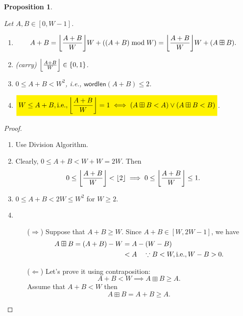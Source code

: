 \documentclass[12pt,openany]{book}
\DeclarePairedDelimiter{\floor}{\lfloor}{\rfloor}
\newcommand{\mathcolorbox}[2]{\colorbox{#1}{$\displaystyle #2$}}
\newtheorem{proposition}[theorem]{Proposition}
\theoremstyle{definition}
\newcommand{\ie}{\textnormal{i.e.}}
\newcommand{\wordlen}{\mathsf{wordlen}}
\begin{document}
	\begin{tcolorbox}[colframe=procolor,title={\color{white}\bf Single-Word Addition \(A+B\)}]
		\begin{proposition}\hypertarget{prop2.2}{}
			Let \(A,B\in[0,W-1]\). \begin{enumerate}[(1)]
				\item \begin{align*}
					A+B=\floor*{\frac{A+B}{W}}W+((A+B)\bmod W)
					=\floor*{\frac{A+B}{W}}W+(A\boxplus B).
				\end{align*}
				\item (carry) \(\floor*{\frac{A+B}{W}}\in\set{0,1}\).
				\item \(0\leq A+B< W^2\), \ie, \(\wordlen(A+B)\leq 2\).
				\item \(\mathcolorbox{yellow}{W\leq A+B,\ie,\floor*{\frac{A+B}{W}}=1\iff (A\boxplus B< A)\lor (A\boxplus B<B)}\).
			\end{enumerate}
		\end{proposition}
	\end{tcolorbox}
	\begin{proof}
		\begin{enumerate}[(1)]
			\item Use Division Algorithm.
			\item Clearly, \(0\leq A+B<W+W=2W\). Then 
			\[
			0\leq\floor*{\frac{A+B}{W}}<\floor{2}\implies0\leq\floor*{\frac{A+B}{W}}\leq 1.
			\]
			\item \(0\leq A+B<2W\leq W^2\) for \(W\geq 2\). 
			\item \begin{itemize}
				\item[(\(\Rightarrow\))] Suppose that \(A+B\geq W\). Since \(A+B\in[W,2W-1]\), we have \begin{align*}
					A\boxplus B=(A+B)-W&=A-(W-B)\\
					&<A\quad\because B<W,\ie, W-B>0.
				\end{align*}
				\item[(\(\Leftarrow\))] Let's prove it using contraposition:  \[
				A+B<W\implies A\boxplus B\geq A.
				\] Assume that \(A+B<W\) then \[
				A\boxplus B=A+B\geq A.
				\]
			\end{itemize}
		\end{enumerate}
	\end{proof}
\end{document}
